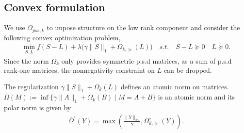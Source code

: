 \subsection{Convex formulation}

We use $\Omega_{pos,k}$ to impose structure on the low rank component and consider the following convex optimization problem,
\begin{align}
\label{opt}
\min_{S,L} f(S-L)+\lambda\big(\gamma\|S\|_{1}+\Omega_{k,\succeq}(L)\big) \quad s.t. \quad S-L \succeq 0 \quad L \succeq 0.
\end{align}
Since the norm $\Omega_k$ only provides symmetric p.s.d matrices, as a sum of p.s.d rank-one matrices, the nonnegativity constraint on $L$ can be dropped. 

\begin{rem} 
The regularization $\gamma\|S\|_{1}+\Omega_k(L)$ defines an atomic norm on matrices. $\bar{\Omega}(M):=\inf\{\gamma\|A\|_{1}+\Omega_k(B)\mid M=A+B\}$ is an atomic norm and its polar norm is given by 
\begin{align*}
{\bar{\Omega}^{\circ}}(Y)=\max\left(\frac{\|Y\|_{\infty}}{\gamma},\Omega_{k,\succeq}^{\circ}(Y)\right).
\end{align*}
\end{rem}


